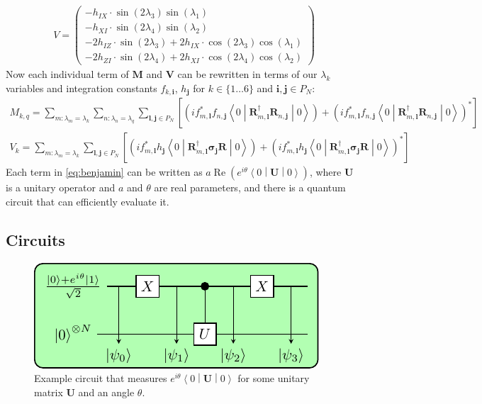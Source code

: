 \documentclass{aux/ttuthes2007}
\newcommand{\sandwich}[3]{\left< #1 \middle\vert #2 \middle\vert #3 \right>}
\newcommand{\s}[1]{\sin\left( #1 \right)}
\newcommand{\co}[1]{\cos\left( #1 \right)}
\newcommand{\paren}[1]{\left( #1 \right)}
\newcommand{\elec}{N}
\begin{document}
\begin{equation*}
	\begin{split}
		V = \begin{pmatrix}
		-	h_{IX} \cdot \s  {2 \lambda_3} \s  {\lambda_1}
%
	\\
		-	h_{XI} \cdot \s  {2 \lambda_4} \s  {\lambda_2}
%
	\\
%
%
		-	2 h_{IZ} \cdot \s  {2 \lambda_3}
		+	2 h_{IX} \cdot \co {2 \lambda_3} \co {\lambda_1}
%
	\\
%
		-	2 h_{ZI} \cdot \s  {2 \lambda_4}
		+	2 h_{XI} \cdot \co {2 \lambda_4} \co {\lambda_2}
		\end{pmatrix}
	\end{split}
\end{equation*}
%
Now each individual term of $\bm M$ and $\bm V$ can be rewritten in terms of our $\lambda_k$ variables and integration constants $f_{k, \bm i}$, $h_{\bm j}$ for $k \in \{1 \ldots 6\}$ and $\bm i, \bm j \in P_\elec$:
%
\begin{equation}\label{eq:benjamin}
\begin{split}
	M_{k, q} 
	= \sum_{m:\lambda_m=\lambda_k} \sum_{n:\lambda_n=\lambda_q} \sum_{\bm l, \bm j \in P_\elec}
	\left[
	\paren{if_{m, \bm l}^*f_{n, \bm j}\sandwich 0 {\bm R_{m, \bm l}^\dagger \bm R_{n, \bm j}} 0}
	+\paren{if_{m, \bm l}^*f_{n, \bm j}\sandwich 0 {\bm R_{m, \bm l}^\dagger \bm R_{n, \bm j}} 0}^*
	\right]\\
	V_{k} 
	= \sum_{m:\lambda_m=\lambda_k} \sum_{\bm l, \bm j \in P_\elec}
	\left[
		\paren{if_{m, \bm l}^*h_{\bm j}\sandwich 0 {\bm R_{m, \bm l}^\dagger \bm \sigma_{\bm j} \bm R} 0}
		+\paren{if_{m, \bm l}^*h_{\bm j}\sandwich 0 {\bm R_{m, \bm l}^\dagger \bm \sigma_{\bm j} \bm R} 0}^*
	\right]
\end{split}
\end{equation}
%
Each term in \ref{eq:benjamin} can be written as $a\operatorname{Re}\paren{e^{i\theta}\sandwich 0 {\bm U} 0}$, 
where $\bm U$ is a unitary operator and $a$ and $\theta$ are real parameters,
and there is a quantum circuit that can efficiently evaluate it.
%
\subsection{\textbf{Circuits}}

\begin{figure}[hb]
  \includegraphics[width=\linewidth]{circuits/circuit1.pdf}
  \caption[Example reduced circuit]{Example circuit that measures $e^{i\theta}\sandwich{0}{\bm U}{0}$ for some unitary matrix $\bm U$ and an angle $\theta$.}
  \label{fig:circuitreal}
\end{figure}
\end{document}
